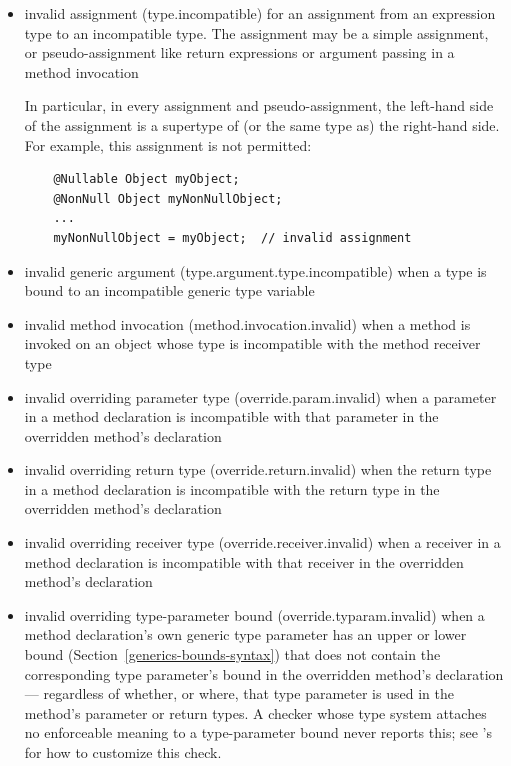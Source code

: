 \begin{itemize}

\item invalid assignment (type.incompatible) for an assignment from
  an expression type to an incompatible type.  The assignment may be a
  simple assignment, or pseudo-assignment like return expressions or
  argument passing in a method invocation

  In particular, in every assignment and pseudo-assignment, the
  left-hand side of the assignment is a supertype of (or the same type
  as) the right-hand side.  For example, this assignment is not
  permitted:

  \begin{Verbatim}
    @Nullable Object myObject;
    @NonNull Object myNonNullObject;
    ...
    myNonNullObject = myObject;  // invalid assignment
  \end{Verbatim}

\item invalid generic argument (type.argument.type.incompatible) when a type
  is bound to an incompatible generic type variable

\item invalid method invocation (method.invocation.invalid) when a
  method is invoked on an object whose type is incompatible with the
  method receiver type

\item invalid overriding parameter type (override.param.invalid)
  when a parameter in a method declaration is incompatible with that
  parameter in the overridden method's declaration

\item invalid overriding return type (override.return.invalid) when the
  return type in a method declaration is incompatible with the
  return type in the overridden method's declaration

\item invalid overriding receiver type (override.receiver.invalid)
  when a receiver in a method declaration is incompatible with that
  receiver in the overridden method's declaration

\item invalid overriding type-parameter bound (override.typaram.invalid)
  when a method declaration's own generic type parameter has an upper or
  lower bound (Section~\ref{generics-bounds-syntax}) that does not contain
  the corresponding type parameter's bound in the overridden method's
  declaration --- regardless of whether, or where, that type parameter is
  used in the method's parameter or return types.  A checker whose type
  system attaches no enforceable meaning to a type-parameter bound never
  reports this; see 's
   for how to customize this
  check.


\end{itemize}
